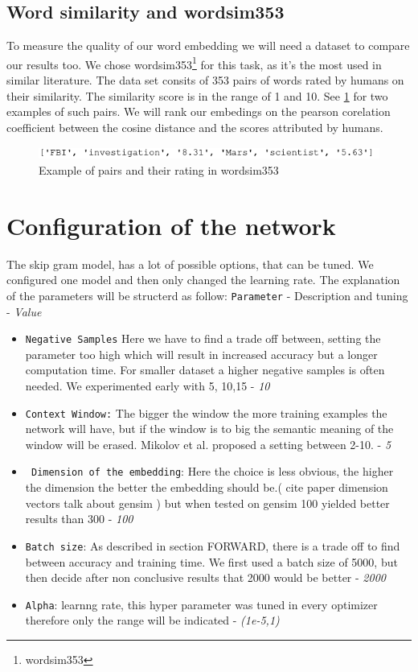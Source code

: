 \subsection{Word similarity and wordsim353}
To measure the quality of our word embedding we will need a dataset to compare our results too. We chose  wordsim353\footnote{wordsim353} for this task, as it's the most used in similar literature. The data set consits of 353 pairs of words rated by humans on their similarity. The similarity score is in the range of 1 and 10. See \ref{fig:ws353_ex} for two examples of such pairs. We will rank our embedings on the pearson corelation coefficient between the cosine distance and the scores attributed by humans. 
\begin{figure}[ht]
    \centering
			\includegraphics[scale=0.7]{images/wordsim353_example} 
    \caption{Example of pairs and their rating in wordsim353}
    \label{fig:ws353_ex}
\end{figure}

\section{Configuration of the network}
The skip gram model, has a lot of possible options, that can be tuned. We configured one model and then only changed the learning rate. The explanation of the parameters will be structerd as follow: 
\texttt{Parameter} - Description and tuning -  \textit{Value}
\begin{itemize}
\item \texttt{Negative Samples} Here we have to find a trade off between, setting the parameter too high which will result in increased accuracy but a longer computation time. For smaller dataset a higher negative samples is often needed. We experimented early with 5, 10,15 - \textit{10}
\item \texttt{Context Window:} The bigger the window the more training examples the network will have, but if the window is to big the semantic meaning of the window will be erased. Mikolov et al. proposed a setting between 2-10. - \textit{5}
\item\texttt{ Dimension of the embedding}: Here the choice is less obvious, the higher the dimension the better the embedding should be.( cite paper dimension vectors talk about gensim ) but when tested on gensim 100 yielded better results than 300 - \textit{100}
\item \texttt{Batch size}: As described in section FORWARD, there is a trade off to find between accuracy and training time. We first used a batch size of 5000, but then decide after non conclusive results  that 2000 would be better - \textit{2000}
\item \texttt{Alpha}: learnng rate, this hyper parameter was tuned in every optimizer therefore only the range will be indicated - \textit{(1e-5,1)}
\end{itemize}

